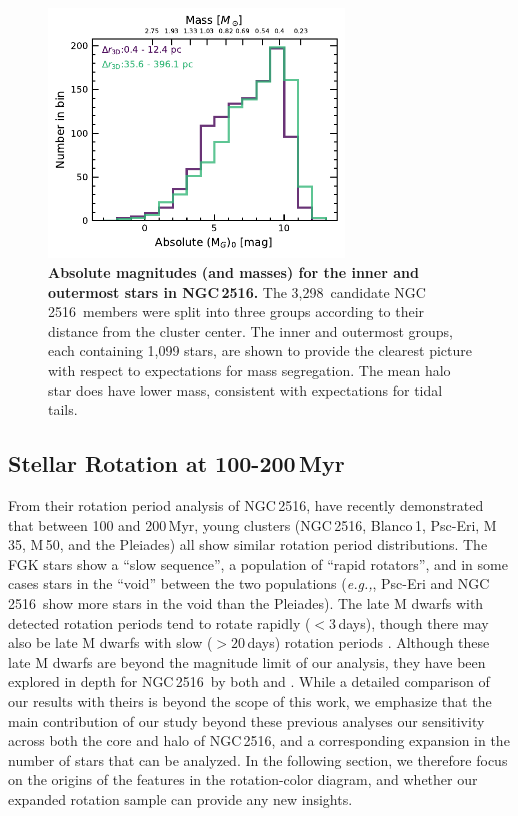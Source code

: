 \documentclass[12pt,twocolumn,tighten]{aastex63}
\newcommand{\cn}{NGC\,2516} %
\newcommand{\nkinematic}{3{,}298} %
\begin{document}
\begin{figure}[t]
	\begin{center}
		\leavevmode
		\includegraphics[width=0.7\textwidth]{f15.pdf}
	\end{center}
	\vspace{-0.7cm}
	\caption{ {\bf Absolute magnitudes (and masses) for the inner and
			outermost stars in \cn.}
		The \nkinematic\ candidate \cn\ members were split into three groups
		according to their distance from the cluster center.
		The inner and outermost groups, each containing 1,099 stars, are shown to
		provide the clearest picture with respect to expectations for mass
		segregation.
		The mean halo star does have lower mass, consistent with expectations
		for tidal tails.
		\label{fig:massfunction}
	}
\end{figure}



\subsection{Stellar Rotation at 100-200\,Myr}
\label{disc:rotn}

From their rotation period analysis of \cn,
\citet{fritzewski_rotation_2020} have recently demonstrated that
between 100 and 200\,Myr, young clusters (\cn, Blanco\,1, Psc-Eri,
M\,35, M\,50, and the Pleiades) all show similar rotation period
distributions.  The FGK stars show a ``slow sequence'', a population
of ``rapid rotators'', and in some cases stars in the ``void'' between
the two populations ({\it e.g.,}, Psc-Eri and \cn\ show more stars in
the void than the Pleiades).  The late M dwarfs with detected rotation
periods tend to rotate rapidly ($<3$\,days), though there may also be
late M dwarfs with slow ($>20$\,days) rotation periods \citep{stauffer_rotation_2016}.  Although
these late M dwarfs are beyond the magnitude limit of our analysis,
they have been explored in depth for \cn\ by both
\citet{Irwin_NGC2516_2007} and \citet{fritzewski_rotation_2020}.
While a detailed comparison of our results with theirs is beyond the
scope of this work, we emphasize that the main contribution of our
study beyond these previous analyses our sensitivity
across both the core and halo of \cn, and a
corresponding expansion in the number of stars that can be analyzed.
In the following section, we therefore focus on the origins of the
features in the rotation-color diagram, and whether our expanded
rotation sample can provide any new insights.
\end{document}
